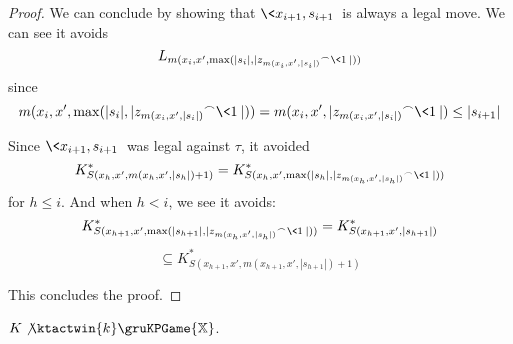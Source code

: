 \begin{proof}
We can conclude by showing that $\<x_{i+1},s_{i+1}\>$ is always a legal move. We can see it avoids
  \[
  L_{m(x_{i},x',\max(|s_{i}|,|{z_{m(x_i,x',|s_i|)}}^\frown\<1\>|))}
  \]
since
  \[
    m(x_{i},x',\max(|s_{i}|,|{z_{m(x_i,x',|s_i|)}}^\frown\<1\>|)) =
    m(x_{i},x',|{z_{m(x_i,x',|s_i|)}}^\frown\<1\>|) \leq
    |s_{i+1}|
  \]

Since $\<x_{i+1},s_{i+1}\>$ was legal against $\tau$, it avoided
  \[
    K^*_{S(x_h,x',m(x_h,x',|s_h|)+1)} =
    K^*_{S(x_h,x',\max(|s_h|,|{z_{m(x_h,x',|s_h|)}}^\frown\<1\>|))}
  \]
for $h\leq i$. And when $h<i$, we see it avoids:
  \[
    K^*_{S(x_{h+1},x',\max(|s_{h+1}|,|{z_{m(x_h,x',|s_h|)}}^\frown\<1\>|))} =
    K^*_{S(x_{h+1},x',|s_{h+1}|)}
  \]
  \[
    \subseteq
    K^*_{S(x_{h+1},x',m(x_{h+1},x',|s_{h+1}|)+1)}
  \]

This concludes the proof.
\end{proof}

\begin{thm}
$K\not\ktactwin{k}\gruKPGame{\mathbb{X}}$.
\end{thm}

